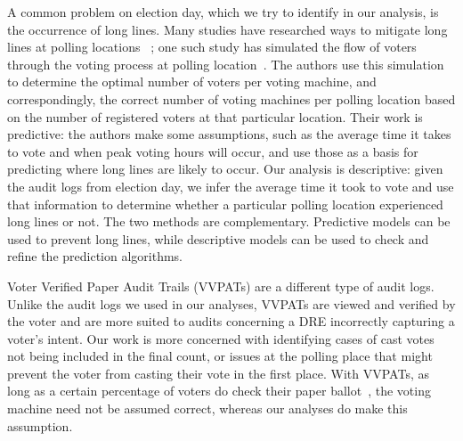 A common problem on election day, which we try to identify in our analysis, is the occurrence of long lines. Many studies have researched ways to mitigate long lines at polling locations ~\cite{Allen2006,Dow2007,Spencer2010,Wilson2008}; one such study has simulated the flow of voters through the voting process at polling location~\cite{Edel2010}. The authors use this simulation to determine the optimal number of voters per voting machine, and correspondingly, the correct number of voting machines per polling location based on the number of registered voters at that particular location. Their work is predictive: the authors make some assumptions, such as the average time it takes to vote and when peak voting hours will occur, and use those as a basis for predicting where long lines are likely to occur. Our analysis is descriptive: given the audit logs from election day, we infer the average time it took to vote and use that information to determine whether a particular polling location experienced long lines or not. The two methods are complementary. Predictive models can be used to prevent long lines, while descriptive models can be used to check and refine the prediction algorithms.

Voter Verified Paper Audit Trails (VVPATs) are a different type of audit logs. Unlike the audit logs we used in our analyses, VVPATs are viewed and verified by the voter and are more suited to audits concerning a DRE incorrectly capturing a voter\textquoteright s intent. Our work is more concerned with identifying cases of cast votes not being included in the final count, or issues at the polling place that might prevent the voter from casting their vote in the first place. With VVPATs, as long as a certain percentage of voters do check their paper ballot~\cite{Hall2006}, the voting machine need not be assumed correct, whereas our analyses do make this assumption.
